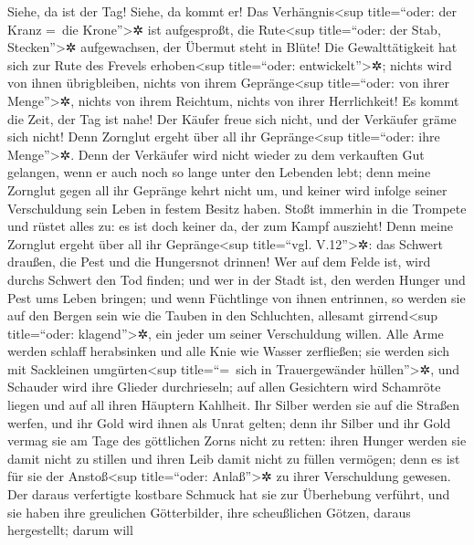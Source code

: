 Siehe, da ist der Tag! Siehe, da kommt er! Das
Verhängnis\textless sup title=``oder: der Kranz =~die
Krone''\textgreater✲ ist aufgesproßt, die Rute\textless sup
title=``oder: der Stab, Stecken''\textgreater✲ aufgewachsen, der Übermut
steht in Blüte! Die Gewalttätigkeit hat sich zur Rute des
Frevels erhoben\textless sup title=``oder: entwickelt''\textgreater✲;
nichts wird von ihnen übrigbleiben, nichts von ihrem
Gepränge\textless sup title=``oder: von ihrer Menge''\textgreater✲,
nichts von ihrem Reichtum, nichts von ihrer Herrlichkeit!
Es kommt die Zeit, der Tag ist nahe! Der Käufer freue
sich nicht, und der Verkäufer gräme sich nicht! Denn Zornglut ergeht
über all ihr Gepränge\textless sup title=``oder: ihre
Menge''\textgreater✲. Denn der Verkäufer wird nicht
wieder zu dem verkauften Gut gelangen, wenn er auch noch so lange unter
den Lebenden lebt; denn meine Zornglut gegen all ihr Gepränge kehrt
nicht um, und keiner wird infolge seiner Verschuldung sein Leben in
festem Besitz haben. Stoßt immerhin in die Trompete und
rüstet alles zu: es ist doch keiner da, der zum Kampf auszieht! Denn
meine Zornglut ergeht über all ihr Gepränge\textless sup title=``vgl.
V.12''\textgreater✲: das Schwert draußen, die Pest und
die Hungersnot drinnen! Wer auf dem Felde ist, wird durchs Schwert den
Tod finden; und wer in der Stadt ist, den werden Hunger und Pest ums
Leben bringen; und wenn Füchtlinge von ihnen entrinnen,
so werden sie auf den Bergen sein wie die Tauben in den Schluchten,
allesamt girrend\textless sup title=``oder: klagend''\textgreater✲, ein
jeder um seiner Verschuldung willen. Alle Arme werden
schlaff herabsinken und alle Knie wie Wasser zerfließen;
sie werden sich mit Sackleinen umgürten\textless sup
title=``=~sich in Trauergewänder hüllen''\textgreater✲, und Schauder
wird ihre Glieder durchrieseln; auf allen Gesichtern wird Schamröte
liegen und auf all ihren Häuptern Kahlheit. Ihr Silber
werden sie auf die Straßen werfen, und ihr Gold wird ihnen als Unrat
gelten; denn ihr Silber und ihr Gold vermag sie am Tage des göttlichen
Zorns nicht zu retten: ihren Hunger werden sie damit nicht zu stillen
und ihren Leib damit nicht zu füllen vermögen; denn es ist für sie der
Anstoß\textless sup title=``oder: Anlaß''\textgreater✲ zu ihrer
Verschuldung gewesen. Der daraus verfertigte kostbare
Schmuck hat sie zur Überhebung verführt, und sie haben ihre greulichen
Götterbilder, ihre scheußlichen Götzen, daraus hergestellt; darum will
